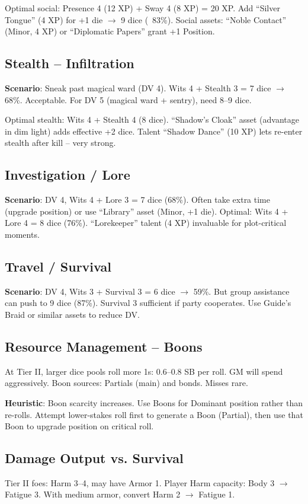 \documentclass[11pt]{article}
\begin{document}
Optimal social: Presence 4 (12 XP) + Sway 4 (8 XP) = 20 XP. Add ``Silver Tongue'' (4 XP) for +1 die $\rightarrow$ 9 dice (~83\%). Social assets: ``Noble Contact'' (Minor, 4 XP) or ``Diplomatic Papers'' grant +1 Position.

\subsection{Stealth -- Infiltration}
\textbf{Scenario}: Sneak past magical ward (DV 4). Wits 4 + Stealth 3 = 7 dice $\rightarrow$ 68\%. Acceptable. For DV 5 (magical ward + sentry), need 8--9 dice.

Optimal stealth: Wits 4 + Stealth 4 (8 dice). ``Shadow's Cloak'' asset (advantage in dim light) adds effective +2 dice. Talent ``Shadow Dance'' (10 XP) lets re-enter stealth after kill -- very strong.

\subsection{Investigation / Lore}
\textbf{Scenario}: DV 4, Wits 4 + Lore 3 = 7 dice (68\%). Often take extra time (upgrade position) or use ``Library'' asset (Minor, +1 die). Optimal: Wits 4 + Lore 4 = 8 dice (76\%). ``Lorekeeper'' talent (4 XP) invaluable for plot-critical moments.

\subsection{Travel / Survival}
\textbf{Scenario}: DV 4, Wits 3 + Survival 3 = 6 dice $\rightarrow$ 59\%. But group assistance can push to 9 dice (87\%). Survival 3 sufficient if party cooperates. Use Guide's Braid or similar assets to reduce DV.

\subsection{Resource Management -- Boons}
At Tier II, larger dice pools roll more 1s: 0.6--0.8 SB per roll. GM will spend aggressively. Boon sources: Partials (main) and bonds. Misses rare.

\textbf{Heuristic}: Boon scarcity increases. Use Boons for Dominant position rather than re-rolls. Attempt lower-stakes roll first to generate a Boon (Partial), then use that Boon to upgrade position on critical roll.

\subsection{Damage Output vs. Survival}
Tier II foes: Harm 3--4, may have Armor 1. Player Harm capacity: Body 3 $\rightarrow$ Fatigue 3. With medium armor, convert Harm 2 $\rightarrow$ Fatigue 1.
\end{document}
